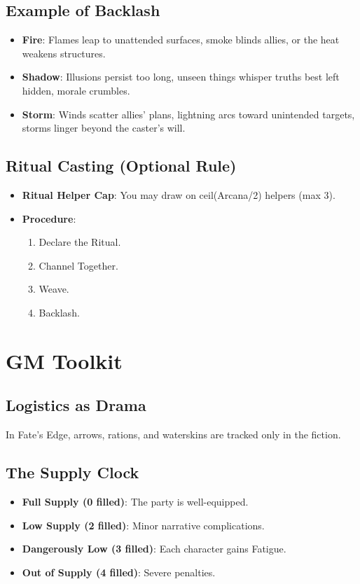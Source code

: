 \documentclass[11pt]{article}
\begin{document}
\subsection{Example of Backlash}
\begin{itemize}
    \item \textbf{Fire}: Flames leap to unattended surfaces, smoke blinds allies, or the heat weakens structures.
    \item \textbf{Shadow}: Illusions persist too long, unseen things whisper truths best left hidden, morale crumbles.
    \item \textbf{Storm}: Winds scatter allies' plans, lightning arcs toward unintended targets, storms linger beyond the caster's will.
\end{itemize}

\subsection{Ritual Casting (Optional Rule)}
\begin{itemize}
    \item \textbf{Ritual Helper Cap}: You may draw on ceil(Arcana/2) helpers (max 3).
    \item \textbf{Procedure}:
    \begin{enumerate}
        \item Declare the Ritual.
        \item Channel Together.
        \item Weave.
        \item Backlash.
    \end{enumerate}
\end{itemize}

\section{GM Toolkit}

\subsection{Logistics as Drama}
In Fate's Edge, arrows, rations, and waterskins are tracked only in the fiction.

\subsection{The Supply Clock}
\begin{itemize}
    \item \textbf{Full Supply (0 filled)}: The party is well-equipped.
    \item \textbf{Low Supply (2 filled)}: Minor narrative complications.
    \item \textbf{Dangerously Low (3 filled)}: Each character gains Fatigue.
    \item \textbf{Out of Supply (4 filled)}: Severe penalties.
\end{itemize}
\end{document}
